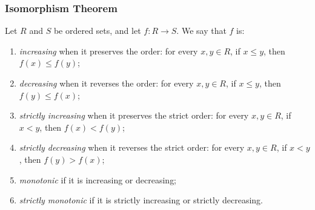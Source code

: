 \subsubsection{Isomorphism Theorem}
\label{sec:isomorfismo}

\begin{definition}
  \label{def:monotonia}%
  Let $R$ and $S$ be ordered sets, and let $f\colon R\to S$. We say that $f$ is:
  \begin{enumerate}
    \item \emph{increasing} when it preserves the order: for every $x,y\in R$, if $x\le y$, then $f(x) \le f(y)$;
    \item \emph{decreasing} when it reverses the order: for every $x,y\in R$, if $x\le y$, then $f(y) \le f(x)$;
    \item \emph{strictly increasing} when it preserves the strict order: for every $x,y\in R$, if $x < y$, then $f(x) < f(y)$;
    \item \emph{strictly decreasing} when it reverses the strict order: for every $x,y\in R$, if $x < y$, then $f(y) > f(x)$;
    \item \emph{monotonic} if it is increasing or decreasing;
    \item \emph{strictly monotonic} if it is strictly increasing or strictly decreasing.
  \end{enumerate}
\end{definition}

